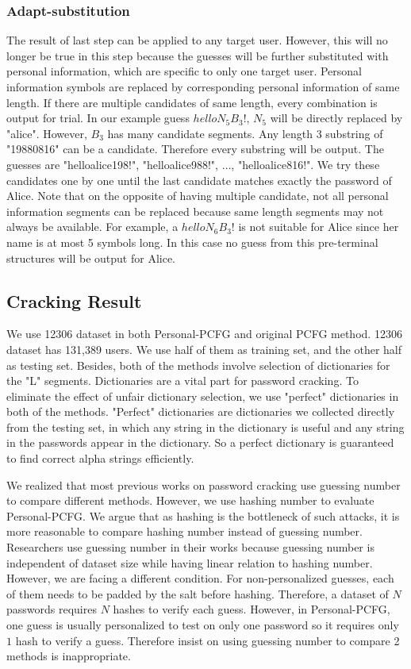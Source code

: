 \subsubsection{Adapt-substitution}
The result of last step can be applied to any target user. However, this will no longer be true in this step because the guesses will be further substituted with personal information, which are specific to only one target user. Personal information symbols are replaced by corresponding personal information of same length. If there are multiple candidates of same length, every combination is output for trial. In our example guess $helloN_5B_3!$, $N_5$ will be directly replaced by "alice". However, $B_3$ has many candidate segments. Any length 3 substring of "19880816" can be a candidate. Therefore every substring will be output. The guesses are "helloalice198!", "helloalice988!", $\ldots$, "helloalice816!". We try these candidates one by one until the last candidate matches exactly the password of Alice. Note that on the opposite of having multiple candidate, not all personal information segments can be replaced because same length segments may not always be available. For example, a $helloN_6B_3!$ is not suitable for Alice since her name is at most 5 symbols long. In this case no guess from this pre-terminal structures will be output for Alice. 

\subsection{Cracking Result}
We use 12306 dataset in both Personal-PCFG and original PCFG method. 12306 dataset has 131,389 users. We use half of them as training set, and the other half as testing set. Besides, both of the methods involve selection of dictionaries for the "L" segments. Dictionaries are a vital part for password cracking. To eliminate the effect of unfair dictionary selection, we use "perfect" dictionaries in both of the methods. "Perfect" dictionaries are dictionaries we collected directly from the testing set, in which any string in the dictionary is useful and any string in the passwords appear in the dictionary. So a perfect dictionary is guaranteed to find correct alpha strings efficiently.

We realized that most previous works on password cracking use guessing number to compare different methods. However, we use hashing number to evaluate Personal-PCFG. We argue that as hashing is the bottleneck of such attacks, it is more reasonable to compare hashing number instead of guessing number. Researchers use guessing number in their works because guessing number is independent of dataset size while having linear relation to hashing number. However, we are facing a different condition. For non-personalized guesses, each of them needs to be padded by the salt before hashing. Therefore, a dataset of $N$ passwords requires $N$ hashes to verify each guess. However, in Personal-PCFG, one guess is usually personalized to test on only one password so it requires only $1$ hash to verify a guess. Therefore insist on using guessing number to compare 2 methods is inappropriate.

